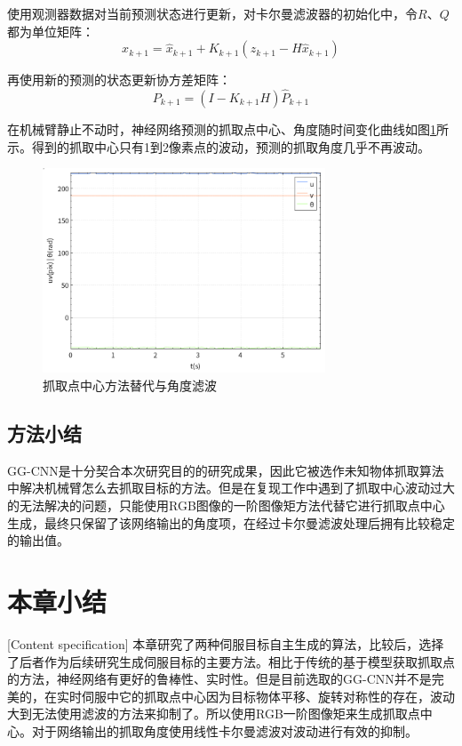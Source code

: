 \documentclass[fontset=fandol,type=bachelor,campus=harbin,bsmainpagenumberline=true]{hithesisbook}
\begin{document}
使用观测器数据对当前预测状态进行更新，对卡尔曼滤波器的初始化中，令$R$、$Q$都为单位矩阵：
\begin{equation}
x_{k+1}=\hat{x}_{k+1}+K_{k+1}\left( z_{k+1}-H\hat{x}_{k+1} \right) 
\label{卡尔曼滤波的增益}
\end{equation}


再使用新的预测的状态更新协方差矩阵：
\begin{equation}
P_{k+1}=\left( I-K_{k+1}H \right) \hat{P}_{k+1}
\label{更新协方差矩阵}
\end{equation}


在机械臂静止不动时，神经网络预测的抓取点中心、角度随时间变化曲线如图\ref{抓取点中心方法替代与角度滤波}所示。得到的抓取中心只有1到2像素点的波动，预测的抓取角度几乎不再波动。
\begin{figure}[h]
\centering
\includegraphics[width = 0.75\textwidth]{chapter3/抓取点中心方法替代与角度滤波}
\caption{抓取点中心方法替代与角度滤波}
\label{抓取点中心方法替代与角度滤波}
\end{figure}

\subsection{方法小结}
GG-CNN是十分契合本次研究目的的研究成果，因此它被选作未知物体抓取算法中解决机械臂怎么去抓取目标的方法。但是在复现工作中遇到了抓取中心波动过大的无法解决的问题，只能使用RGB图像的一阶图像矩方法代替它进行抓取点中心生成，最终只保留了该网络输出的角度项，在经过卡尔曼滤波处理后拥有比较稳定的输出值。

\section{本章小结}[Content specification]
本章研究了两种伺服目标自主生成的算法，比较后，选择了后者作为后续研究生成伺服目标的主要方法。相比于传统的基于模型获取抓取点的方法，神经网络有更好的鲁棒性、实时性。但是目前选取的GG-CNN并不是完美的，在实时伺服中它的抓取点中心因为目标物体平移、旋转对称性的存在，波动大到无法使用滤波的方法来抑制了。所以使用RGB一阶图像矩来生成抓取点中心。对于网络输出的抓取角度使用线性卡尔曼滤波对波动进行有效的抑制。
\end{document}

